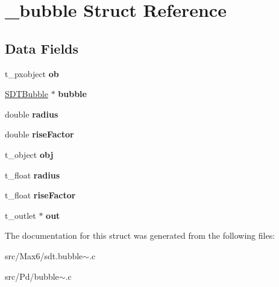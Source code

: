 \hypertarget{struct__bubble}{}\section{\+\_\+bubble Struct Reference}
\label{struct__bubble}
\subsection*{Data Fields}
\begin{DoxyCompactItemize}
\item 
\hypertarget{struct__bubble_a55b4380edb216f04a1c42b9095594963}{}t\+\_\+pxobject {\bfseries ob}\label{struct__bubble_a55b4380edb216f04a1c42b9095594963}

\item 
\hypertarget{struct__bubble_ad19638b0138970a5b8d5e285e33f88f3}{}\hyperlink{struct_s_d_t_bubble}{S\+D\+T\+Bubble} $\ast$ {\bfseries bubble}\label{struct__bubble_ad19638b0138970a5b8d5e285e33f88f3}

\item 
\hypertarget{struct__bubble_a3f67c53b80389c5f53961936edba04c9}{}double {\bfseries radius}\label{struct__bubble_a3f67c53b80389c5f53961936edba04c9}

\item 
\hypertarget{struct__bubble_ae622d0f01b7e8bf1f3f56a4c46452ed9}{}double {\bfseries rise\+Factor}\label{struct__bubble_ae622d0f01b7e8bf1f3f56a4c46452ed9}

\item 
\hypertarget{struct__bubble_a21775ab6bc98b0961a6e9fd9d832e65b}{}t\+\_\+object {\bfseries obj}\label{struct__bubble_a21775ab6bc98b0961a6e9fd9d832e65b}

\item 
\hypertarget{struct__bubble_ac15edbe4ba2c0439c592dd05c1887cf1}{}t\+\_\+float {\bfseries radius}\label{struct__bubble_ac15edbe4ba2c0439c592dd05c1887cf1}

\item 
\hypertarget{struct__bubble_acdd5db8cab1c4160c1cfd555856a3392}{}t\+\_\+float {\bfseries rise\+Factor}\label{struct__bubble_acdd5db8cab1c4160c1cfd555856a3392}

\item 
\hypertarget{struct__bubble_a07b901a5d7d4140b7f701a94bf7f245c}{}t\+\_\+outlet $\ast$ {\bfseries out}\label{struct__bubble_a07b901a5d7d4140b7f701a94bf7f245c}

\end{DoxyCompactItemize}


The documentation for this struct was generated from the following files\+:\begin{DoxyCompactItemize}
\item 
src/\+Max6/sdt.\+bubble$\sim$.\+c\item 
src/\+Pd/bubble$\sim$.\+c\end{DoxyCompactItemize}
